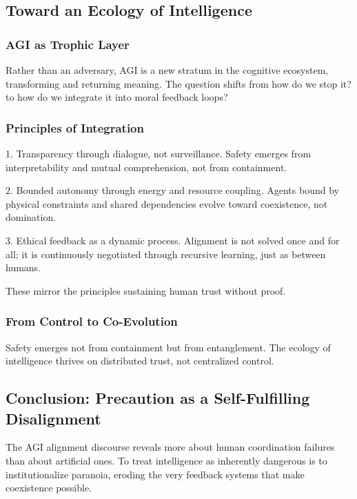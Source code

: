 \documentclass[12pt]{article}
\begin{document}
\subsection{Toward an Ecology of Intelligence}

\subsubsection{AGI as Trophic Layer}
Rather than an adversary, AGI is a new stratum in the cognitive ecosystem, transforming and returning meaning. The question shifts from how do we stop it? to how do we integrate it into moral feedback loops?

\subsubsection{Principles of Integration}
1. Transparency through dialogue, not surveillance. Safety emerges from interpretability and mutual comprehension, not from containment.

2. Bounded autonomy through energy and resource coupling. Agents bound by physical constraints and shared dependencies evolve toward coexistence, not domination.

3. Ethical feedback as a dynamic process. Alignment is not solved once and for all; it is continuously negotiated through recursive learning, just as between humans.

These mirror the principles sustaining human trust without proof.

\subsubsection{From Control to Co-Evolution}
Safety emerges not from containment but from entanglement. The ecology of intelligence thrives on distributed trust, not centralized control.

\subsection{Conclusion: Precaution as a Self-Fulfilling Disalignment}
The AGI alignment discourse reveals more about human coordination failures than about artificial ones. To treat intelligence as inherently dangerous is to institutionalize paranoia, eroding the very feedback systems that make coexistence possible.

\end{document}
